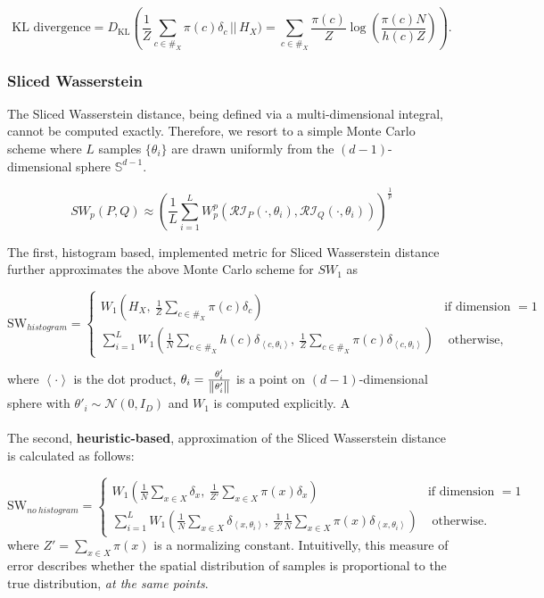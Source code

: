 \[\text{KL divergence} = D_{\text{KL}} \left( \frac 1 Z \sum_{c \in \#_X} \pi(c) \delta_c \,\bigg|\bigg| \, H_X) =  \sum_{c \in \#_X} \frac{\pi(c)}{Z} \log\left(\frac{\pi(c) N}{h(c) Z} \right)\right) .\]

\subsubsection{Sliced Wasserstein}

The Sliced Wasserstein distance, being defined via a multi-dimensional integral, cannot be computed exactly. Therefore, we resort to a simple Monte Carlo scheme where $L$ samples $\{\theta_i\}$ are drawn uniformly from the $(d-1)$-dimensional sphere $\mathbb S^{d-1}$.

$$ 
SW_p(P, Q) \approx \left( \frac 1 L \sum_{i=1}^L W_p^p\left(\mathcal{RI}_P(\cdot, \theta_i), \mathcal{RI}_Q(\cdot, \theta_i) \right) \right)^{\frac 1 p}
$$

The first, histogram based, implemented metric for Sliced Wasserstein distance further approximates the above Monte Carlo scheme for $SW_1$ as

\[\text{SW}_{histogram} = \begin{cases}
W_1 \left( H_X,\  \frac 1 Z \sum_{c \in \#_X} \pi(c) \delta_c \right) & \text{if dimension } = 1 \\
\sum_{i = 1}^L W_1 \left( \frac 1 N \sum_{c \in \#_X} h(c) \delta_{\left<c, \theta_i \right>},\  \frac 1 Z \sum_{c \in \#_X} \pi(c) \delta_{\left<c, \theta_i \right>}  \right) & \text{ otherwise, }
\end{cases}\]

where $\left< \cdot \right>$ is the dot product, $\theta_i = \frac{\theta'_i}{\norm{\theta'_i}}$ is a point on $(d-1)$-dimensional sphere with $
\theta'_i \sim \mathcal N(0, I_D)$ and $W_1$ is computed explicitly.  A \\\\

The second, \textbf{heuristic-based}, approximation of the Sliced Wasserstein distance is calculated as follows:

\[\text{SW}_{no\ histogram} = \begin{cases}
W_1 \left( \frac 1 N \sum_{x \in X} \delta_x,\  \frac 1 {Z'} \sum_{x \in X} \pi(x) \delta_x \right) & \text{if dimension } = 1 \\
\sum_{i = 1}^L W_1 \left(  \frac 1 N \sum_{x \in X} \delta_{\left<x, \theta_i \right>},\ \frac 1 {Z'} \frac 1 N \sum_{x \in X} \pi(x) \delta_{\left<x, \theta_i \right>}  \right) & \text{ otherwise. }
\end{cases}\]
where $Z' = \sum_{x \in X} \pi(x) $ is a normalizing constant. Intuitivelly, this measure of error describes whether the spatial distribution of samples is proportional to the true distribution, \textit{at the same points}.


